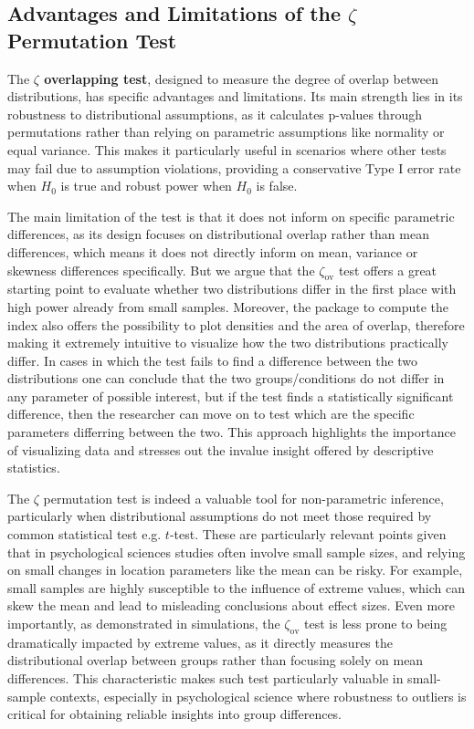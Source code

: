\documentclass[twocolumn]{article}\usepackage[]{graphicx}\usepackage[]{xcolor}
\begin{document}
\subsection*{Advantages and Limitations of the $\zeta$ Permutation Test}

The \textbf{$\zeta$  overlapping test}, designed to measure the degree of overlap between distributions, has specific advantages and limitations. Its main strength lies in its robustness to distributional assumptions, as it calculates p-values through permutations rather than relying on parametric assumptions like normality or equal variance. This makes it particularly useful in scenarios where other tests may fail due to assumption violations, providing a conservative Type I error rate when \(H_0\) is true and robust power when \(H_0\) is false.

The main limitation of the test is that it does not inform on specific parametric differences, as its design focuses on distributional overlap rather than mean differences, which means it does not directly inform on mean, variance or skewness differences specifically. But we argue that the $\zeta_{\mbox{ov}}$ test offers a great starting point to evaluate whether two distributions differ in the first place with high power already from small samples. Moreover, the package to compute the index also offers the possibility to plot densities and the area of overlap, therefore making it extremely intuitive to visualize how the two distributions practically differ. In cases in which the test fails to find a difference between the two distributions one can conclude that the two groups/conditions do not differ in any parameter of possible interest, but if the test finds a statistically significant difference, then the researcher can move on to test which are the specific parameters differring between the two. This approach highlights the importance of visualizing data and stresses out the invalue insight offered by descriptive statistics.

The $\zeta$ permutation test is indeed a valuable tool for non-parametric inference, particularly when distributional assumptions do not meet those required by common statistical test e.g. $t$-test. These are particularly relevant points given that in psychological sciences studies often involve small sample sizes, and relying on small changes in location parameters like the mean can be risky. For example, small samples are highly susceptible to the influence of extreme values, which can skew the mean and lead to misleading conclusions about effect sizes. Even more importantly, as demonstrated in simulations, the $\zeta_{\mbox{ov}}$ test is less prone to being dramatically impacted by extreme values, as it directly measures the distributional overlap between groups rather than focusing solely on mean differences. This characteristic makes such test particularly valuable in small-sample contexts, especially in psychological science where robustness to outliers is critical for obtaining reliable insights into group differences.
\end{document}
